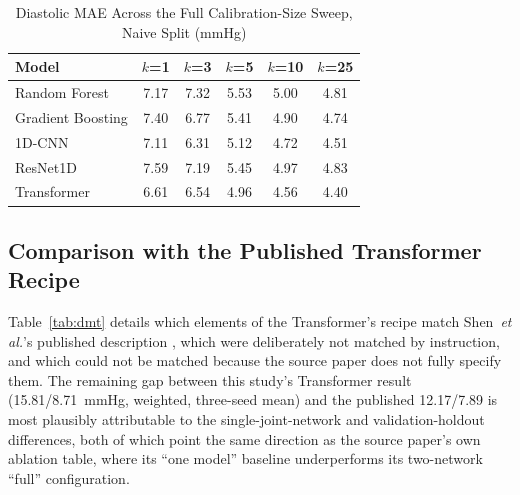 \documentclass[journal]{IEEEtran}
\begin{document}
\begin{table}[!t]
\caption{Diastolic MAE Across the Full Calibration-Size Sweep, Naive Split (mmHg)}
\label{tab:kfull}
\centering
\begin{tabular}{lccccc}
\toprule
Model & $k$=1 & $k$=3 & $k$=5 & $k$=10 & $k$=25 \\
\midrule
Random Forest & 7.17 & 7.32 & 5.53 & 5.00 & 4.81 \\
Gradient Boosting & 7.40 & 6.77 & 5.41 & 4.90 & 4.74 \\
1D-CNN & 7.11 & 6.31 & 5.12 & 4.72 & 4.51 \\
ResNet1D & 7.59 & 7.19 & 5.45 & 4.97 & 4.83 \\
Transformer & 6.61 & 6.54 & 4.96 & 4.56 & 4.40 \\
\bottomrule
\end{tabular}
\end{table}

\subsection{Comparison with the Published Transformer Recipe}
Table~\ref{tab:dmt} details which elements of the Transformer's recipe match Shen~\textit{et al.}'s published description \cite{shen2026}, which were deliberately not matched by instruction, and which could not be matched because the source paper does not fully specify them. The remaining gap between this study's Transformer result (15.81/8.71~mmHg, weighted, three-seed mean) and the published 12.17/7.89 is most plausibly attributable to the single-joint-network and validation-holdout differences, both of which point the same direction as the source paper's own ablation table, where its ``one model'' baseline underperforms its two-network ``full'' configuration.
\end{document}
